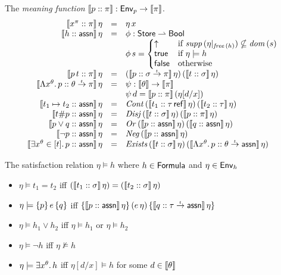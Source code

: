 \documentclass[12pt,a4paper]{report}
\newcommand{\Neg}{\nstyle{Neg}}
\newcommand{\Or}{\nstyle{Or}}
\newcommand{\Cont}{\nstyle{Cont}}
\newcommand{\Disj}{\nstyle{Disj}}
\newcommand{\Exists}{\nstyle{Exists}}
\begin{document}
\noindent The {\em meaning function} $\llbracket p\mathrel{::}\pi\rrbracket: \mathsf{Env}_p \to \llbracket\pi\rrbracket$.
\[\begin{array}{rcl}
  \semantic{\tj{x^\pi}{\pi}}\,\eta 
    &=& \eta\,x \\
  \semantic{\tj{h}{\tassn}}\,\eta
    &=& \phi:\Store \pto \Bool \\
    & & \phi\,s = \bcase
                    \uparrow  & \text{if } \supp{\eta|_{\free{h}}} \nsubseteq \dom{s} \\
                    \true     & \text{if } \eta \models h \\
                    \false    & \text{otherwise}
                  \ecase \\
  \semantic{\tj{\app{p}{t}}{\pi}}\,\eta
    &=& (\semantic{\tj{p}{\ttarrow{\sigma}{\pi}}}\,\eta)\,
        (\semantic{\tj{t}{\sigma}}\,\eta) \\
  \semantic{\tj{\tabstr{x^\theta}{p}}{\ttarrow{\theta}{\pi}}}\,\eta
    &=& \psi: \semantic{\theta} \to \semantic{\pi} \\
    & & \psi\,d = \semantic{\tj{p}{\pi}}\,(\eta[d/x]) \\
  \semantic{\tj{t_1 \mapsto t_2}{\tassn}}\,\eta 
    &=& \Cont\,(\semantic{\tj{t_1}{\tref{\tau}}}\,\eta)\,(\semantic{\tj{t_2}{\tau}}\,\eta) \\
  \semantic{\tj{t \# p}{\tassn}}\,\eta
    &=& \Disj\,(\semantic{\tj{t}{\sigma}}\,\eta)\,(\semantic{\tj{p}{\pi}}\,\eta) \\
  \semantic{\tj{p \vee q}{\tassn}}\,\eta
    &=& \Or\,(\semantic{\tj{p}{\tassn}}\,\eta)\,(\semantic{\tj{q}{\tassn}}\,\eta) \\
  \semantic{\tj{\neg p}{\tassn}}\,\eta 
    &=& \Neg\,(\semantic{\tj{p}{\tassn}}\,\eta) \\
  \semantic{\tj{\qbex{x^\theta}{t}{p}}{\tassn}}\,\eta
  &=& \Exists\,(\semantic{\tj{t}{\sigma}}\,\eta)\,
               (\semantic{\tj{\tabstr{x^\theta}{p}}{\ttarrow{\theta}{\tassn}}}\,\eta) \\
\end{array}\]

\noindent The satisfaction relation $\eta \models h$ where $h \in \mathsf{Formula}$ and $\eta \in \mathsf{Env}_h$
\begin{itemize}
  \item $\eta \models t_1 = t_2$ iff $(\llbracket t_1\mathrel{::}\sigma\rrbracket\,\eta) = (\llbracket t_2\mathrel{::}\sigma\rrbracket\,\eta)$

  \item $\eta \models \{p\}\,e\,\{q\}$ iff
        $\{\llbracket p\mathrel{::}\mathsf{assn}\rrbracket\,\eta\}\,(e\,\eta)\,\{\llbracket q\mathrel{::}\tau\stackrel{_t}{\to}\mathsf{assn}\rrbracket\,\eta\}$

  \item $\eta \models h_1 \vee h_2$ iff $\eta \models h_1$ or $\eta \models h_2$

  \item $\eta \models \neg h$ iff $\eta \not\models h$
  
  \item $\eta \models \exists x^\theta.\,h$ iff $\eta[d/x] \models h$ for some $d \in \llbracket\theta\rrbracket$
\end{itemize}
\end{document}
